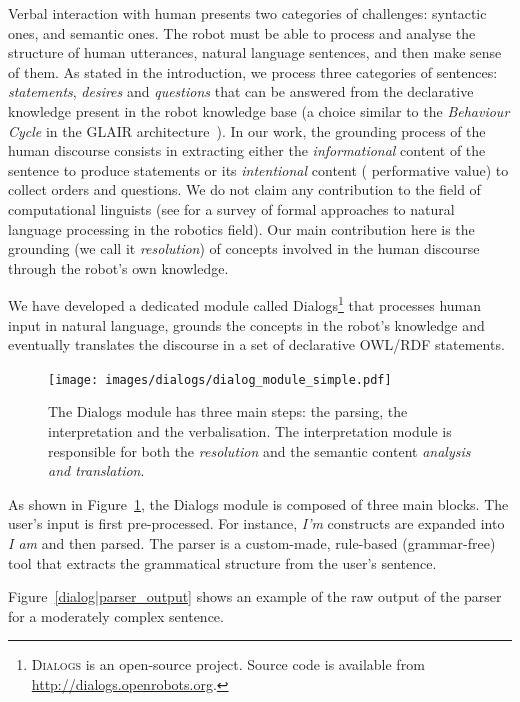 Verbal interaction with human presents two categories of challenges: syntactic
ones, and semantic ones. The robot must be able to process and analyse the
structure of human utterances, \ie natural language sentences, and then make
sense of them. As stated in the introduction, we process three categories of
sentences: \emph{statements}, \emph{desires} and \emph{questions} that can be
answered from the declarative knowledge present in the robot knowledge base (a
choice similar to the \emph{Behaviour Cycle} in the GLAIR
architecture~\cite{Shapiro2009}). In our work, the grounding process of the
human discourse consists in extracting either the \emph{informational} content
of the sentence to produce statements or its \emph{intentional} content (\ie
performative value) to collect orders and questions. We do not claim any
contribution to the field of computational linguists (see \cite{Kruijff2010}
for a survey of formal approaches to natural language processing in the
robotics field). Our main contribution here is the grounding (we call it
\emph{resolution}) of concepts involved in the human discourse through the
robot's own knowledge.

We have developed a dedicated module called {\sc
Dialogs}\footnote{\textsc{Dialogs} is an open-source project. Source code is
available from \url{http://dialogs.openrobots.org}.} that processes human
input in natural language, grounds the concepts in the robot's knowledge and
eventually translates the discourse in a set of declarative OWL/RDF statements.

\begin{figure}[!ht]
\centering
  \texttt{[image: images/dialogs/dialog\_module\_simple.pdf]}
  \caption{The {\sc Dialogs} module has three main steps: the parsing,
  the interpretation and the verbalisation. The interpretation module is
  responsible for both the \emph{resolution} and the semantic content
  \emph{analysis and translation}.} 
  \label{fig|dialog}
\end{figure}

As shown in Figure~\ref{fig|dialog}, the {\sc Dialogs} module is composed of
three main blocks. The user's input is first pre-processed. For instance,
\emph{I'm} constructs are expanded into \emph{I am} and then parsed. The parser
is a custom-made, rule-based (\ie grammar-free) tool that extracts the
grammatical structure from the user's sentence.

Figure~\ref{dialog|parser_output} shows an example of the raw output of the
parser for a moderately complex sentence.

